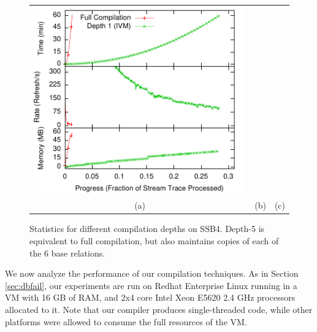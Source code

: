\begin{figure}
\begin{center}
\begin{minipage}{\textwidth}
\begin{center}
\begin{tabular}{ccc}
\includegraphics[width=\figurewidth]{../graphs/graphs/unified_brokerspread.pdf} \\
(a) & (b) & (c)
\end{tabular}
\caption{Performance comparison on TPC-H Query 18 (a), AXFINDER (b) and BROKERSPREAD (c). (a) An incorrectly chosen join ordering prevents full compilation from effectively exploiting foreign key dependencies in the TPC-H schema. (b,c) Full compilation's aggressive materialization strategy results in the caches growing too large to be efficiently maintained.}
\label{fig:experiments:tpch18}
\label{fig:experiments:axfinder}
\label{fig:experiments:brokerspread}
\end{center}
\end{minipage}

\vspace*{0.1in}

\begin{minipage}{\textwidth}
\begin{center}

\caption{Statistics for different compilation depths on SSB4.  Depth-5 is equivalent to full compilation, but also maintains copies of each of the 6 base relations.}
\end{center}
\end{minipage}

\end{center}
\end{figure}

We now analyze the performance of our compilation techniques.  As in Section \ref{sec:dbfail}, our experiments are run on Redhat Enterprise Linux running in a VM with 16 GB of RAM, and 2x4 core Intel Xeon E5620 2.4 GHz processors allocated to it.  Note that our compiler produces single-threaded code, while other platforms were allowed to consume the full resources of the VM.
 
